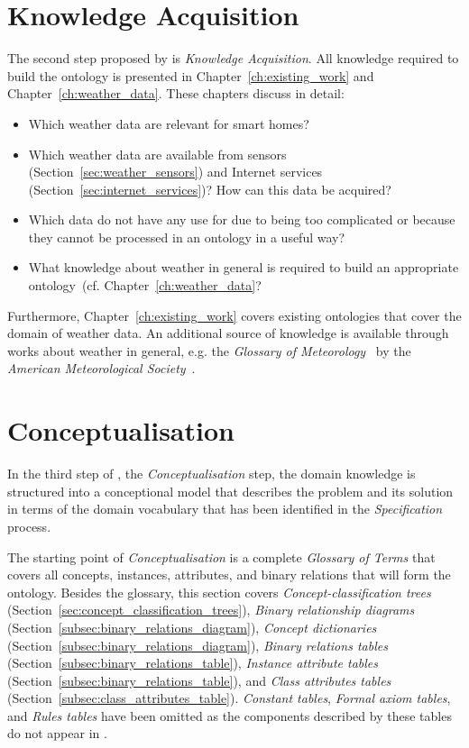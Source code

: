 \section{Knowledge Acquisition}

The second step proposed by \methontology is \emph{Knowledge Acquisition}. All knowledge required to build the \smarthomeweather ontology is presented in Chapter~\ref{ch:existing_work} and Chapter~\ref{ch:weather_data}. These chapters discuss in detail:

\begin{itemize}
  \item Which weather data are relevant for smart homes?
  \item Which weather data are available from sensors (Section~\ref{sec:weather_sensors}) and Internet services (Section~\ref{sec:internet_services})? How can this data be acquired?
  \item Which data do not have any use for \smarthomeweather due to being too complicated or because they cannot be processed in an ontology in a useful way?
  \item What knowledge about weather in general is required to build an appropriate ontology~(cf. Chapter~\ref{ch:weather_data}?
\end{itemize}

Furthermore, Chapter~\ref{ch:existing_work} covers existing ontologies that cover the domain of weather data. An additional source of knowledge is available through works about weather in general, e.g. the \emph{Glossary of Meteorology}~\cite{GlossaryOfMeteorology} by the \emph{American Meteorological Society}~\cite{AMS}.

\section{Conceptualisation}
\label{sec:ontology_concept}

In the third step of \methontology, the \emph{Conceptualisation} step, the domain knowledge is structured into a conceptional model that describes the problem and its solution in terms of the domain vocabulary that has been identified in the \emph{Specification} process.

The starting point of \emph{Conceptualisation} is a complete \emph{Glossary of Terms} that covers all concepts, instances, attributes, and binary relations that will form the ontology. Besides the glossary, this section covers \emph{Concept-classification trees} (Section~\ref{sec:concept_classification_trees}), \emph{Binary relationship diagrams} (Section~\ref{subsec:binary_relations_diagram}), \emph{Concept dictionaries} (Section~\ref{subsec:binary_relations_diagram}), \emph{Binary relations tables} (Section~\ref{subsec:binary_relations_table}), \emph{Instance attribute tables} (Section~\ref{subsec:binary_relations_table}), and \emph{Class attributes tables} (Section~\ref{subsec:class_attributes_table}). \emph{Constant tables}, \emph{Formal axiom tables}, and \emph{Rules tables} have been omitted as the components described by these tables do not appear in \smarthomeweather.

